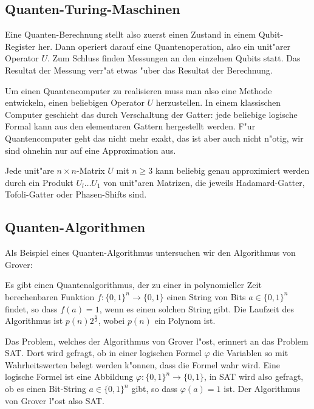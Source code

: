 \subsection{Quanten-Turing-Maschinen}
Eine Quanten-Berechnung stellt also zuerst einen Zustand in einem
Qubit-Register her.
Dann operiert darauf eine Quantenoperation, also ein unit"arer Operator $U$.
Zum Schluss finden Messungen an den einzelnen Qubits statt.
Das Resultat der Messung verr"at etwas "uber das Resultat der Berechnung.

Um einen Quantencomputer zu realisieren muss man also eine Methode
entwickeln, einen beliebigen Operator $U$ herzustellen.
In einem klassischen Computer geschieht das durch Verschaltung der
Gatter: jede beliebige logische Formal kann aus den elementaren
Gattern hergestellt werden.
F"ur Quantencomputer geht das nicht mehr exakt, das ist aber auch nicht
n"otig, wir sind ohnehin nur auf eine Approximation aus.

\begin{satz}
Jede unit"are $n\times n$-Matrix $U$ mit $n\ge 3$ kann beliebig genau
approximiert werden durch ein Produkt $U_l\dots U_1$ von unit"aren
Matrizen, die jeweils Hadamard-Gatter, Tofoli-Gatter oder Phasen-Shifts
sind.
\cite[Theorem 10.12]{skript:arorabarak}
\end{satz}

\subsection{Quanten-Algorithmen}
Als Beispiel eines Quanten-Algorithmus untersuchen wir den Algorithmus
von Grover:
\begin{satz}[Grover]
Es gibt einen Quantenalgorithmus, der zu einer in polynomieller Zeit
berechenbaren Funktion $f\colon\{0,1\}^n\to\{0,1\}$ einen String von Bits
$a\in\{0,1\}^n$ findet, so dass $f(a)=1$, wenn es einen solchen String gibt.
Die Laufzeit des Algorithmus ist $p(n) 2^{\frac{n}2}$, wobei $p(n)$ ein
Polynom ist.
\label{skript:satz-von-grover}
\end{satz}

Das Problem, welches der Algorithmus von Grover l"ost, erinnert an das
Problem SAT.
Dort wird gefragt, ob in einer logischen Formel $\varphi$ die Variablen
so mit Wahrheitswerten belegt werden k"onnen, dass die Formel wahr wird.
Eine logische Formel ist eine Abbildung $\varphi\colon\{0,1\}^n\to\{0,1\}$,
in SAT wird also gefragt, ob es einen Bit-String $a\in\{0,1\}^n$ gibt, 
so dass $\varphi(a)=1$ ist.
Der Algorithmus von Grover l"ost also SAT.

